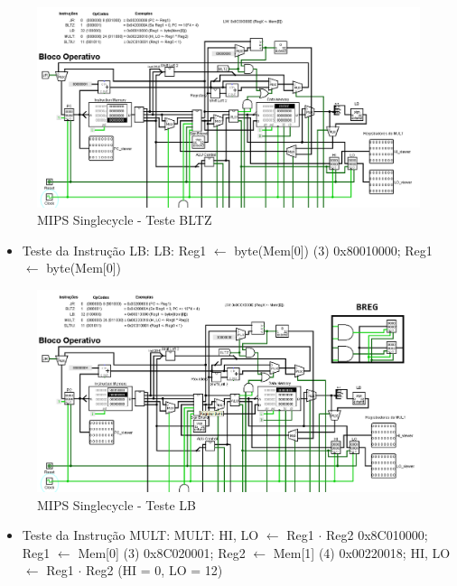 \documentclass{report}
\begin{document}
        \begin{figure}[h!]
            \centering
            \includegraphics[width=\linewidth]{images/prints/Monocycle/Teste BLTZ.png}
            \caption{\label{print:singlecycle_test_BLTZ} MIPS Singlecycle - Teste BLTZ}
        \end{figure}

        \begin{itemize}
            \item Teste da Instrução LB:
                \subitem LB: Reg1 $\leftarrow$ byte(Mem[0]) (3)
                \subitem 0x80010000; Reg1 $\leftarrow$ byte(Mem[0])
        \end{itemize}

        \begin{figure}[h!]
            \centering
            \includegraphics[width=\linewidth]{images/prints/Monocycle/Teste LB.png}
            \caption{\label{print:singlecycle_test_LB} MIPS Singlecycle - Teste LB}
        \end{figure}

        \begin{itemize}
            \item Teste da Instrução MULT:
                \subitem MULT: HI, LO $\leftarrow$ Reg1 $\cdot$ Reg2
                \subitem 0x8C010000; Reg1 $\leftarrow$ Mem[0] (3)
                \subitem 0x8C020001; Reg2 $\leftarrow$ Mem[1] (4)
                \subitem 0x00220018; HI, LO $\leftarrow$ Reg1 $\cdot$ Reg2 (HI = 0, LO = 12)
        \end{itemize}
\end{document}
